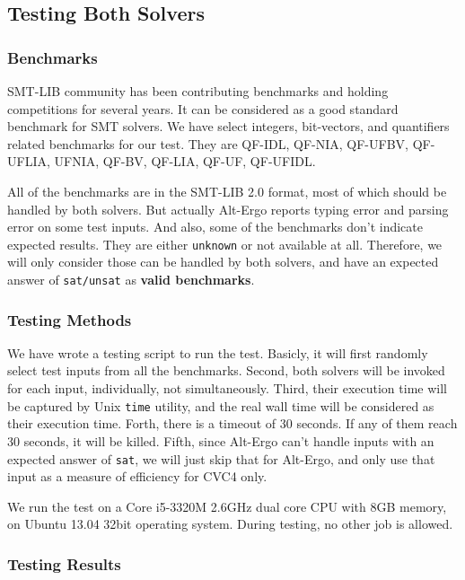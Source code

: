 \documentclass[10pt,twocolumn,letter]{article}
\theoremstyle{definition}
\begin{document}
\subsection{Testing Both Solvers}

\subsubsection{Benchmarks}

SMT-LIB community has been contributing benchmarks and holding competitions for several years\cite{bs2010}. It can be considered as a good standard benchmark for SMT solvers. We have select integers, bit-vectors, and quantifiers related benchmarks for our test. They are QF-IDL, QF-NIA, QF-UFBV, QF-UFLIA, UFNIA, QF-BV, QF-LIA, QF-UF, QF-UFIDL.

All of the benchmarks are in the SMT-LIB 2.0 format, most of which should be handled by both solvers. But actually Alt-Ergo reports typing error and parsing error on some test inputs. And also, some of the benchmarks don't indicate expected results. They are either {\tt unknown} or not available at all. Therefore, we will only consider those can be handled by both solvers, and have an expected answer of {\tt sat/unsat} as {\bf valid benchmarks}.

\subsubsection{Testing Methods}

We have wrote a testing script to run the test. Basicly, it will first randomly select test inputs from all the benchmarks. Second, both solvers will be invoked for each input, individually, not simultaneously. Third, their execution time will be captured by Unix {\tt time} utility, and the real wall time will be considered as their execution time. Forth, there is a timeout of 30 seconds. If any of them reach 30 seconds, it will be killed. Fifth, since Alt-Ergo can't handle inputs with an expected answer of {\tt sat}, we will just skip that for Alt-Ergo, and only use that input as a measure of efficiency for CVC4 only.

We run the test on a Core i5-3320M 2.6GHz dual core CPU with 8GB memory, on Ubuntu 13.04 32bit operating system. During testing, no other job is allowed.

\subsubsection{Testing Results}
\end{document}
